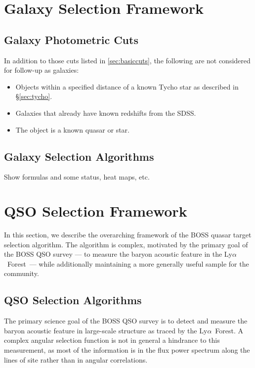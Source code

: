 \documentclass[12pt,preprint]{aastex}
\newcommand{\Lyaf}{Ly$\alpha$~Forest}
\begin{document}
\section{Galaxy Selection Framework} \label{sec:galframe}

\subsection{Galaxy Photometric Cuts}

In addition to those cuts listed in \ref{sec:basiccuts}, the following are not
considered for follow-up as galaxies:

\begin{itemize}

    \item Objects within a specified distance of a known Tycho star
    \citep{tycho2} as described in \S \ref{sec:tycho}.  

    \item Galaxies that already have known redshifts from the SDSS.

    \item The object is a known quasar or star.

\end{itemize}

\subsection{Galaxy Selection Algorithms}

Show formulas and some status, heat maps, etc.


\section{QSO Selection Framework} \label{sec:qsoframe}

In this section, we describe the overarching framework of the BOSS
quasar target selection algorithm. The algorithm is complex, motivated
by the primary goal of the BOSS QSO survey --- to measure the baryon
acoustic feature in the \Lyaf\ --- while additionally maintaining a more
generally useful sample for the community.

\subsection{QSO Selection Algorithms}

The primary science goal of the BOSS QSO survey is to detect and measure
the baryon acoustic feature in large-scale structure as traced by
the \Lyaf. A complex angular selection function is not in general a
hindrance to this measurement, as most of the information is in the
flux power spectrum along the lines of site rather than in angular
correlations.
\end{document}
